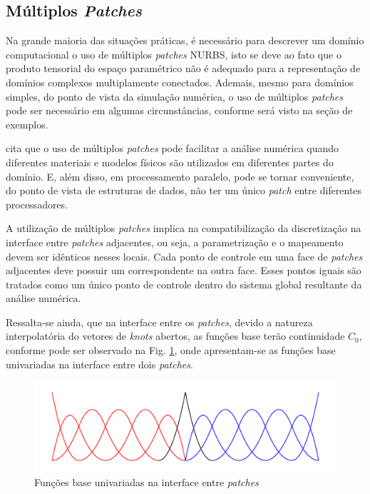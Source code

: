 \documentclass[tese_patricia]{subfiles}
\begin{document}
\subsection{Múltiplos \textit{Patches}}

Na grande maioria das situações práticas, é necessário para descrever um domínio computacional o uso de múltiplos \textit{patches} NURBS, isto se deve ao fato que o produto tensorial do espaço paramétrico não é adequado para a representação de domínios complexos multiplamente conectados. Ademais, mesmo para domínios simples, do ponto de vista da simulação numérica, o uso de múltiplos \textit{patches} pode ser necessário em algumas circunstâncias, conforme será visto na seção de exemplos.

 cita que o uso de múltiplos \textit{patches} pode facilitar a análise numérica quando diferentes materiais e modelos físicos são utilizados em diferentes partes do domínio. E, além disso, em processamento paralelo, pode se tornar conveniente, do ponto de vista de estruturas de dados, não ter um único \textit{patch} entre diferentes processadores.

A utilização de múltiplos \textit{patches} implica na compatibilização da discretização na interface entre \textit{patches} adjacentes, ou seja, a parametrização e o mapeamento devem ser idênticos nesses locais. Cada ponto de controle em uma face de \textit{patches} adjacentes deve possuir um correspondente na outra face. Esses pontos iguais são tratados como um único ponto de controle dentro do sistema global resultante da análise numérica. 

Ressalta-se ainda, que na interface entre os \textit{patches}, devido a natureza interpolatória do vetores de \textit{knots} abertos, as funções base terão continuidade $C_0$, conforme pode ser observado na Fig. \ref{fig:multiplos_patches}, onde apresentam-se as funções base univariadas na interface entre dois \textit{patches}.

\begin{figure}[htb!]
	\centering 
	\includegraphics[scale=0.5,trim=0cm 0cm 0cm 0cm, clip=true]{Imagens/Cap3/patches.pdf}	
	\caption{Funções base univariadas na interface entre \textit{patches}}
	\label{fig:multiplos_patches}
\end{figure}
\end{document}
